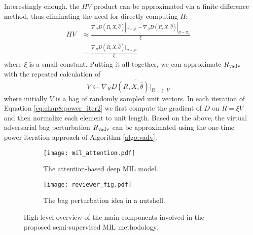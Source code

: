 \documentclass[journal,twoside,web]{ieeecolor}
\begin{document}
Interestingly enough, the $HV$ product can be approximated 
via a finite difference method, thus eliminating the need
for directly computing $H$:
\begin{align}
  HV &\approx \frac{\nabla_R D(R, X, \hat{\theta})|_{R=\xi V} - \nabla_R D(R, X,
	\hat{\theta})|_{R=R_0}}{\xi} \\
     &= \frac{\nabla_R D(R, X, \hat{\theta})|_{R=\xi V}}{\xi}
\end{align}
where $\xi$ is a small constant.
Putting it all together, we can approximate 
$R\textsubscript{vadv}$ with the repeated calculation of
\begin{equation}
V \gets \overline{\nabla_R D\left(R,X,\hat{\theta}\right) |_{R=\xi \cdot V}} \label{eq:chap8:power_iter2}
\end{equation}
where initially $V$ is a bag of randomly sampled unit vectors.
In each iteration of Equation \ref{eq:chap8:power_iter2} we first compute the gradient of $D$ on
$R=\xi V$ and then normalize each element to unit length.
Based on the above, the virtual adversarial bag perturbation
$R\textsubscript{vadv}$ can be approximated using the one-time power iteration
approach of Algorithm \ref{algo:vadv}.

\begin{figure*}[!h]
  \centering
      \begin{subfigure}[b]{\textwidth}
       \centering
       \texttt{[image: mil\_attention.pdf]}
       \caption{The attention-based deep MIL model.}
       \label{fig:mil_attention}
     \end{subfigure}
      \begin{subfigure}[b]{\textwidth}
       \centering
       \texttt{[image: reviewer\_fig.pdf]}
       \caption{The bag perturbation idea in a nutshell.}
       \label{fig:y equals x}
     \end{subfigure}
     \caption{High-level overview of the main components involved in the
     proposed semi-supervised MIL methodology.}
        \label{fig:method_overview}
\end{figure*}
\end{document}
